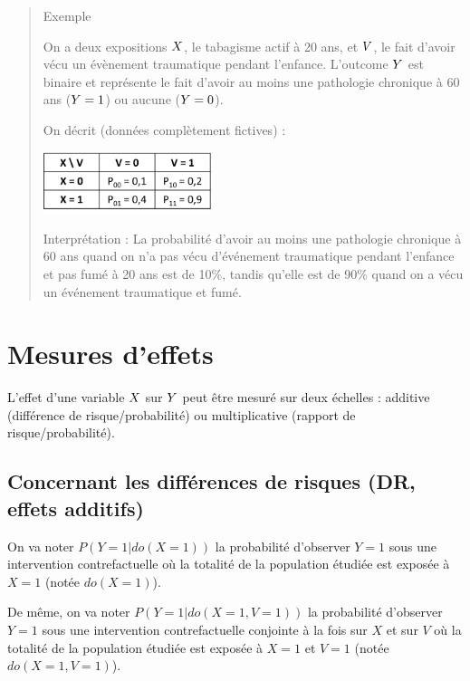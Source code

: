 \documentclass[
]{book}
\begin{document}
\begin{quote}
Exemple

On a deux expositions \(\small X\), le tabagisme actif à 20 ans, et \(\small V\), le fait d'avoir vécu un évènement traumatique pendant l'enfance. L'outcome \(\small Y\) est binaire et représente le fait d'avoir au moins une pathologie chronique à 60 ans (\(\small Y=1\)) ou aucune (\(\small Y=0\)).

On décrit (données complètement fictives) :

\includegraphics[width=0.4\textwidth,height=\textheight]{img/Image1.png}

Interprétation : La probabilité d'avoir au moins une pathologie chronique à 60 ans quand on n'a pas vécu d'événement traumatique pendant l'enfance et pas fumé à 20 ans est de 10\%, tandis qu'elle est de 90\% quand on a vécu un événement traumatique et fumé.
\end{quote}

\hypertarget{mesures-deffets}{%
\section{Mesures d'effets}\label{mesures-deffets}}

L'effet d'une variable \(\small X\) sur \(\small Y\) peut être mesuré sur deux échelles : additive (différence de risque/probabilité) ou multiplicative (rapport de risque/probabilité).

\hypertarget{concernant-les-diffuxe9rences-de-risques-dr-effets-additifs}{%
\subsection*{Concernant les différences de risques (DR, effets additifs)}\label{concernant-les-diffuxe9rences-de-risques-dr-effets-additifs}}

On va noter \(P(Y = 1|do(X = 1))\) la probabilité d'observer \(Y=1\) sous une intervention contrefactuelle où la totalité de la population étudiée est exposée à \(X=1\) (notée \(do(X=1)\)).

De même, on va noter \(P(Y = 1|do(X=1,V=1))\) la probabilité d'observer \(Y=1\) sous une intervention contrefactuelle conjointe à la fois sur \(X\) et sur \(V\) où la totalité de la population étudiée est exposée à \(X=1\) et \(V=1\) (notée \(do(X=1,V=1)\)).
\end{document}

